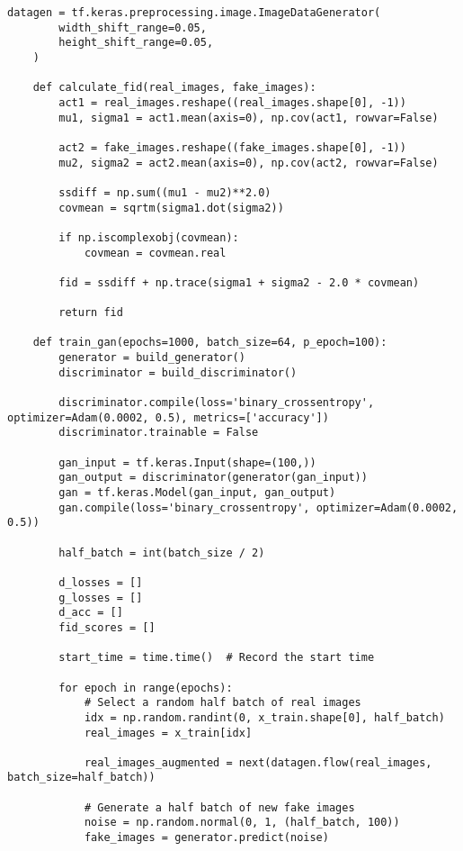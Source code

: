 \begin{lstlisting}[style=mypython, caption=Explore Data Augmetation (width and height shift {0.05})]
    datagen = tf.keras.preprocessing.image.ImageDataGenerator(
        width_shift_range=0.05,
        height_shift_range=0.05,
    )
    
    def calculate_fid(real_images, fake_images):
        act1 = real_images.reshape((real_images.shape[0], -1))
        mu1, sigma1 = act1.mean(axis=0), np.cov(act1, rowvar=False)
        
        act2 = fake_images.reshape((fake_images.shape[0], -1))
        mu2, sigma2 = act2.mean(axis=0), np.cov(act2, rowvar=False)
        
        ssdiff = np.sum((mu1 - mu2)**2.0)
        covmean = sqrtm(sigma1.dot(sigma2))
        
        if np.iscomplexobj(covmean):
            covmean = covmean.real
        
        fid = ssdiff + np.trace(sigma1 + sigma2 - 2.0 * covmean)
        
        return fid
    
    def train_gan(epochs=1000, batch_size=64, p_epoch=100):
        generator = build_generator()
        discriminator = build_discriminator()
    
        discriminator.compile(loss='binary_crossentropy', optimizer=Adam(0.0002, 0.5), metrics=['accuracy'])
        discriminator.trainable = False
    
        gan_input = tf.keras.Input(shape=(100,))
        gan_output = discriminator(generator(gan_input))
        gan = tf.keras.Model(gan_input, gan_output)
        gan.compile(loss='binary_crossentropy', optimizer=Adam(0.0002, 0.5))
    
        half_batch = int(batch_size / 2)
        
        d_losses = []
        g_losses = []
        d_acc = []
        fid_scores = []
        
        start_time = time.time()  # Record the start time
    
        for epoch in range(epochs):
            # Select a random half batch of real images
            idx = np.random.randint(0, x_train.shape[0], half_batch)
            real_images = x_train[idx]
    
            real_images_augmented = next(datagen.flow(real_images, batch_size=half_batch))
    
            # Generate a half batch of new fake images
            noise = np.random.normal(0, 1, (half_batch, 100))
            fake_images = generator.predict(noise)
    

\end{lstlisting}

